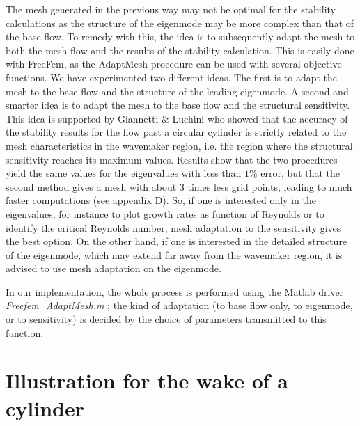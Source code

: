 \documentclass[twocolumn,10pt]{asme2ej}
\begin{document}
The mesh generated in the previous way may not be optimal for the stability calculations as the structure of the eigenmode may be more complex than that of the base flow. To remedy with this, the idea is to subsequently adapt the mesh to both the mesh flow and the results of the stability calculation. This is easily done with FreeFem, as the  AdaptMesh procedure can be used with several objective functions. We have experimented two different ideas. The first is to adapt the mesh to the base flow and the structure of the leading eigenmode. A second and smarter idea is to adapt the mesh to the base flow and the structural sensitivity. This idea is supported by Giannetti \& Luchini\cite{GiannettiLuchini} who showed that the accuracy of the stability results for the flow past a circular cylinder is strictly related to the mesh characteristics in the wavemaker region, i.e. the region where the structural sensitivity reaches its maximum values. 
Results show that the two procedures yield the same values for the eigenvalues with less than $1\%$ error, but that the second method gives a mesh with about 3 times less grid points, leading to much faster computations (see appendix D). So, if one is interested only in the eigenvalues, for instance to plot growth rates as function of Reynolds or to identify the critical Reynolds number, mesh adaptation to the sensitivity gives the best option. On the other hand, if one is interested in the detailed structure of the eigenmode, which may extend far away from the wavemaker region, it is advised to use mesh adaptation on the eigenmode. 

In our implementation, the whole process is performed using the Matlab driver {\em Freefem\_AdaptMesh.m} ; the kind of adaptation  (to base flow only, to eigenmode, or to sensitivity) is decided by the choice of parameters transmitted to this function.






\section{Illustration for the wake of a cylinder} 
\vspace{.2cm}
\end{document}
